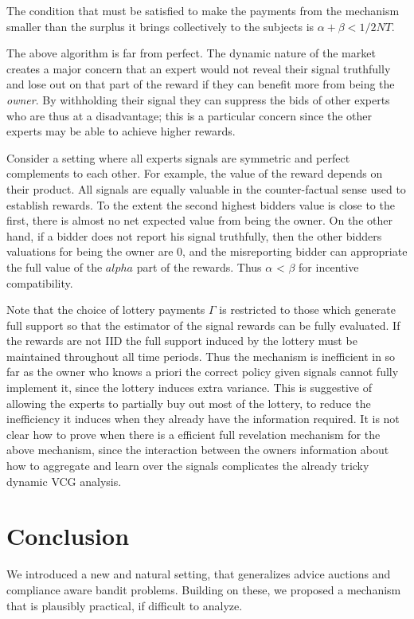The condition that must be satisfied to make the payments from the mechanism smaller than the surplus it brings collectively to the subjects is $ \alpha + \beta < 1/2NT$.


The above algorithm is far from perfect.
The dynamic nature of the market creates a major concern that an expert would not reveal their signal truthfully and lose out on that part of the reward if they can benefit more from being the \emph{owner}.
By withholding their signal they can suppress the bids of other experts who are thus at a disadvantage; this is a particular concern since the other experts may be able to achieve higher rewards.

Consider a setting where all experts signals are symmetric and perfect complements to each other.
For example, the value of the reward depends on their product.
All signals are equally valuable in the counter-factual sense used to establish rewards.
To the extent the second highest bidders value is close to the first, there is almost no net expected value from being the owner.
On the other hand, if a bidder does not report his signal truthfully, then the other bidders valuations for being the owner are 0, and the misreporting bidder can appropriate the full value of the $alpha$ part of the rewards.
Thus $\alpha$ < $\beta$ for incentive compatibility. 

Note that the choice of lottery payments $\Gamma$ is restricted to those which generate full support so that the estimator of the signal rewards can be fully evaluated. 
If the rewards are not IID the full support induced by the lottery must be maintained throughout all time periods. 
Thus the mechanism is inefficient in so far as the owner who knows a priori the correct policy given signals cannot fully implement it, since the lottery induces extra variance.
This is suggestive of allowing the experts to partially buy out most of the lottery, to reduce the inefficiency it induces when they already have the information required. 
It is not clear how to prove when there is a efficient full revelation mechanism for the above mechanism, since the interaction between the owners information about how to aggregate and learn over the signals complicates the already tricky dynamic VCG analysis. 


\section{Conclusion}

We introduced a new and natural setting, that generalizes advice auctions and compliance aware bandit problems.
Building on these, we proposed a mechanism that is plausibly practical, if difficult to analyze.




